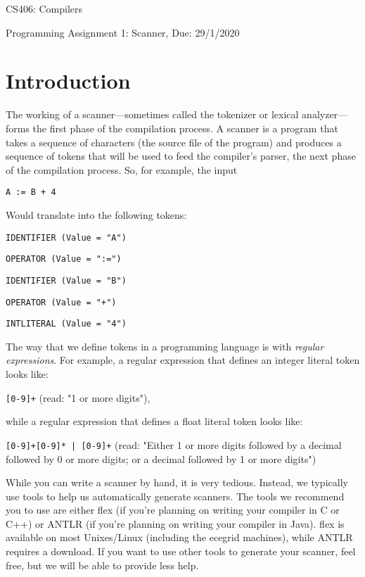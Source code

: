 \documentclass{article}
\begin{document}
\begin{center}{\LARGE CS406: Compilers} \end{center}
\begin{center}{\large Programming Assignment 1: Scanner,  Due: 29/1/2020} \end{center}

\bigskip



\section{Introduction}
The working of a scanner---sometimes called the tokenizer or lexical analyzer---forms the first phase of the compilation process. 
A scanner is a program that takes a sequence of characters (the source file of the program) and produces a sequence of tokens that will be used to feed the compiler's parser, the next phase of the compilation process.
So, for example, the input

\texttt{A := B + 4}

Would translate into the following tokens:

\texttt{IDENTIFIER (Value = "A")}

\texttt{OPERATOR (Value = ":=")}

\texttt{IDENTIFIER (Value = "B")}

\texttt{OPERATOR (Value = "+")}

\texttt{INTLITERAL (Value = "4")}

The way that we define tokens in a programming language is with {\em regular expressions}. For example, a regular expression that defines an integer literal token looks like: 

\texttt{[0-9]+} (read: "1 or more digits"),

while a regular expression that defines a float literal token looks like: 

\texttt{[0-9]+\.[0-9]* | \.[0-9]+} (read: "Either 1 or more digits followed by a decimal followed by 0 or more digits; or a decimal followed by 1 or more digits")

While you can write a scanner by hand, it is very tedious. Instead, we typically use tools to help us automatically generate scanners. The tools we recommend you to use are either flex (if you're planning on writing your compiler in C or C++) or ANTLR (if you're planning on writing your compiler in Java). flex is available on most Unixes/Linux (including the ecegrid machines), while ANTLR requires a download. If you want to use other tools to generate your scanner, feel free, but we will be able to provide less help.
\end{document}
